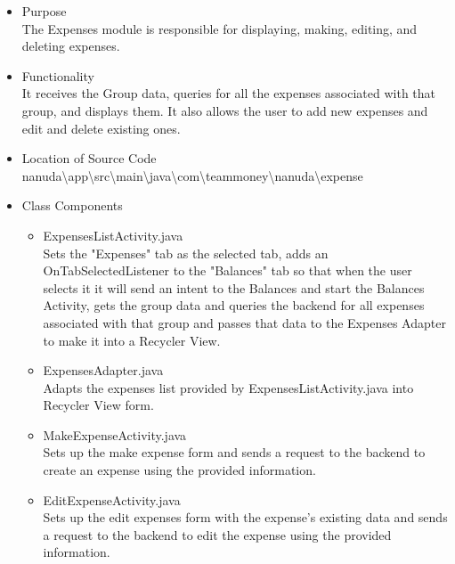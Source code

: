 \documentclass[conference]{IEEEtran}
\begin{document}
\begin{itemize}
    \item Purpose \\ The Expenses module is responsible for displaying, making, editing, and deleting expenses.
    \item Functionality \\ It receives the Group data, queries for all the expenses associated with that group, and displays them. It also allows the user to add new expenses and edit and delete existing ones.
    \item Location of Source Code \\ nanuda\textbackslash{}app\textbackslash{}src\textbackslash{}main\textbackslash{}java\textbackslash{}com\textbackslash{}teammoney\textbackslash{}nanuda\textbackslash{}expense
    \item Class Components
        \begin{itemize}
            \item ExpensesListActivity.java \\ Sets the "Expenses" tab as the selected tab, adds an OnTabSelectedListener to the "Balances" tab so that when the user selects it it will send an intent to the Balances and start the Balances Activity, gets the group data and queries the backend for all expenses associated with that group and passes that data to the Expenses Adapter to make it into a Recycler View.
            \item ExpensesAdapter.java \\ Adapts the expenses list provided by ExpensesListActivity.java into Recycler View form.
            \item MakeExpenseActivity.java \\ Sets up the make expense form and sends a request to the backend to create an expense using the provided information.
            \item EditExpenseActivity.java \\ Sets up the edit expenses form with the expense's existing data and sends a request to the backend to edit the expense using the provided information.
        \end{itemize}
\end{itemize}
\end{document}
